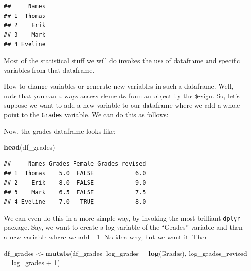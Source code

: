 \documentclass[]{article}
\newenvironment{Shaded}{\begin{snugshade}}{\end{snugshade}}
\newcommand{\KeywordTok}[1]{\textcolor[rgb]{0.13,0.29,0.53}{\textbf{{#1}}}}
\newcommand{\DataTypeTok}[1]{\textcolor[rgb]{0.13,0.29,0.53}{{#1}}}
\newcommand{\DecValTok}[1]{\textcolor[rgb]{0.00,0.00,0.81}{{#1}}}
\newcommand{\StringTok}[1]{\textcolor[rgb]{0.31,0.60,0.02}{{#1}}}
\newcommand{\NormalTok}[1]{{#1}}
\theoremstyle{definition}
\theoremstyle{definition}
\theoremstyle{definition}
\theoremstyle{remark}
\begin{document}
\begin{verbatim}
##     Names
## 1  Thomas
## 2    Erik
## 3    Mark
## 4 Eveline
\end{verbatim}

Most of the statistical stuff we will do invokes the use of dataframe
and specific variables from that dataframe.

How to change variables or generate new variables in such a dataframe.
Well, note that you can always access elements from an object by the
\texttt{\$}-sign. So, let's suppose we want to add a new variable to our
dataframe where we add a whole point to the \texttt{Grades} variable. We
can do this as follows:

\begin{Shaded}
\end{Shaded}

Now, the grades dataframe looks like:

\begin{Shaded}
\begin{Highlighting}[]
\KeywordTok{head}\NormalTok{(df_grades)}
\end{Highlighting}
\end{Shaded}

\begin{verbatim}
##     Names Grades Female Grades_revised
## 1  Thomas    5.0  FALSE            6.0
## 2    Erik    8.0  FALSE            9.0
## 3    Mark    6.5  FALSE            7.5
## 4 Eveline    7.0   TRUE            8.0
\end{verbatim}

We can even do this in a more simple way, by invoking the most brilliant
\texttt{dplyr} package. Say, we want to create a log variable of the
``Grades'' variable and then a new variable where we add +1. No idea
why, but we want it. Then

\begin{Shaded}
\begin{Highlighting}[]
\NormalTok{df_grades <-}\StringTok{ }\KeywordTok{mutate}\NormalTok{(df_grades, }
               \DataTypeTok{log_grades =} \KeywordTok{log}\NormalTok{(Grades),}
               \DataTypeTok{log_grades_revised =} \NormalTok{log_grades +}\StringTok{ }\DecValTok{1}\NormalTok{)}
\end{Highlighting}
\end{Shaded}
\end{document}
